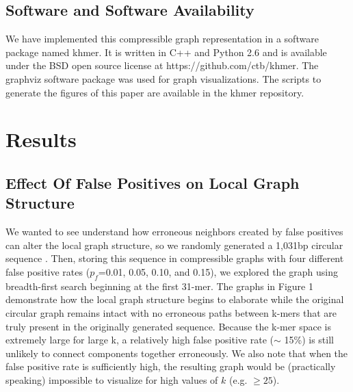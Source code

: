 \documentclass[12pt]{article} \usepackage{simplemargins}
\begin{document}
\subsection{Software and Software Availability}
We have implemented this compressible graph representation in a software package
named khmer.
It is written in C++
and Python 2.6 and is available under the BSD open source license at
https://github.com/ctb/khmer.
The graphviz software 
package was used for graph visualizations. The scripts to 
generate the figures of this paper are available in the khmer repository.

\section{Results}

\subsection{Effect Of False Positives on Local Graph Structure}
We wanted to see understand how erroneous neighbors created 
by false positives can alter 
the local graph structure, so we randomly generated a 1,031bp circular sequence .
Then, storing this sequence in compressible graphs with
four different false positive rates ($p_f$=0.01, 0.05, 0.10, and
0.15), we explored the graph using breadth-first search beginning at
the first 31-mer. 
The graphs in Figure 
1 demonstrate how
the local graph structure begins to elaborate while the original circular
graph remains intact with no erroneous paths between k-mers that are
truly present in the originally generated sequence. Because the k-mer
space is extremely large for large k, a relatively high false positive 
rate ($\sim$ 15\%) is still 
unlikely to connect components
together erroneously. We also note that when the false positive
rate is sufficiently high, the resulting graph would be
(practically speaking) impossible to visualize for high values of $k$ (e.g. $\ge 25$). 
\end{document}
